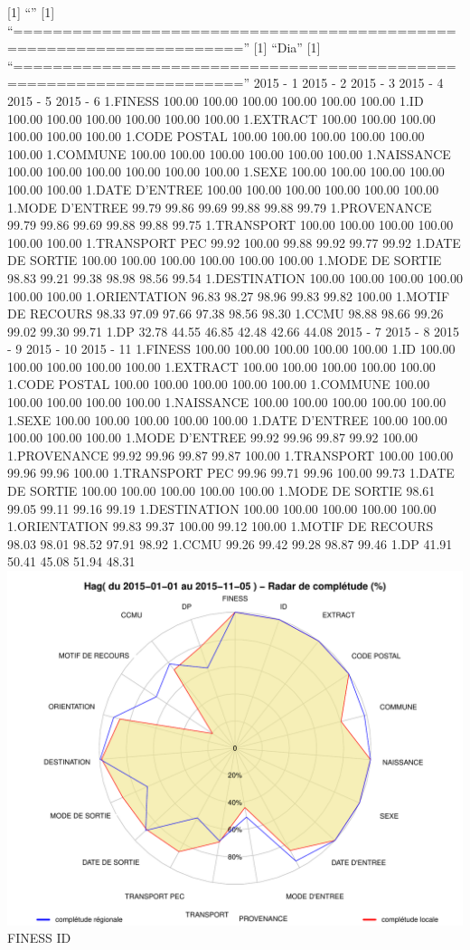 \documentclass[]{article}
\begin{document}
{[}1{]} ``'' {[}1{]}
``=====================================================================''
{[}1{]} ``Dia'' {[}1{]}
``=====================================================================''
2015 - 1 2015 - 2 2015 - 3 2015 - 4 2015 - 5 2015 - 6 1.FINESS 100.00
100.00 100.00 100.00 100.00 100.00 1.ID 100.00 100.00 100.00 100.00
100.00 100.00 1.EXTRACT 100.00 100.00 100.00 100.00 100.00 100.00 1.CODE
POSTAL 100.00 100.00 100.00 100.00 100.00 100.00 1.COMMUNE 100.00 100.00
100.00 100.00 100.00 100.00 1.NAISSANCE 100.00 100.00 100.00 100.00
100.00 100.00 1.SEXE 100.00 100.00 100.00 100.00 100.00 100.00 1.DATE
D'ENTREE 100.00 100.00 100.00 100.00 100.00 100.00 1.MODE D'ENTREE 99.79
99.86 99.69 99.88 99.88 99.79 1.PROVENANCE 99.79 99.86 99.69 99.88 99.88
99.75 1.TRANSPORT 100.00 100.00 100.00 100.00 100.00 100.00 1.TRANSPORT
PEC 99.92 100.00 99.88 99.92 99.77 99.92 1.DATE DE SORTIE 100.00 100.00
100.00 100.00 100.00 100.00 1.MODE DE SORTIE 98.83 99.21 99.38 98.98
98.56 99.54 1.DESTINATION 100.00 100.00 100.00 100.00 100.00 100.00
1.ORIENTATION 96.83 98.27 98.96 99.83 99.82 100.00 1.MOTIF DE RECOURS
98.33 97.09 97.66 97.38 98.56 98.30 1.CCMU 98.88 98.66 99.26 99.02 99.30
99.71 1.DP 32.78 44.55 46.85 42.48 42.66 44.08 2015 - 7 2015 - 8 2015 -
9 2015 - 10 2015 - 11 1.FINESS 100.00 100.00 100.00 100.00 100.00 1.ID
100.00 100.00 100.00 100.00 100.00 1.EXTRACT 100.00 100.00 100.00 100.00
100.00 1.CODE POSTAL 100.00 100.00 100.00 100.00 100.00 1.COMMUNE 100.00
100.00 100.00 100.00 100.00 1.NAISSANCE 100.00 100.00 100.00 100.00
100.00 1.SEXE 100.00 100.00 100.00 100.00 100.00 1.DATE D'ENTREE 100.00
100.00 100.00 100.00 100.00 1.MODE D'ENTREE 99.92 99.96 99.87 99.92
100.00 1.PROVENANCE 99.92 99.96 99.87 99.87 100.00 1.TRANSPORT 100.00
100.00 99.96 99.96 100.00 1.TRANSPORT PEC 99.96 99.71 99.96 100.00 99.73
1.DATE DE SORTIE 100.00 100.00 100.00 100.00 100.00 1.MODE DE SORTIE
98.61 99.05 99.11 99.16 99.19 1.DESTINATION 100.00 100.00 100.00 100.00
100.00 1.ORIENTATION 99.83 99.37 100.00 99.12 100.00 1.MOTIF DE RECOURS
98.03 98.01 98.52 97.91 98.92 1.CCMU 99.26 99.42 99.28 98.87 99.46 1.DP
41.91 50.41 45.08 51.94 48.31
\includegraphics{completude_files/figure-latex/finess-6.pdf} FINESS ID
\end{document}
